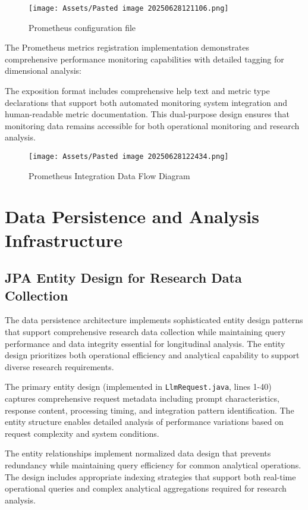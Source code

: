 \begin{figure}[H]
    \centering
    \texttt{[image: Assets/Pasted image 20250628121106.png]}
    \caption{Prometheus configuration file}
\end{figure}

The Prometheus metrics registration implementation demonstrates comprehensive performance monitoring capabilities with detailed tagging for dimensional analysis:



The exposition format includes comprehensive help text and metric type declarations that support both automated monitoring system integration and human-readable metric documentation. This dual-purpose design ensures that monitoring data remains accessible for both operational monitoring and research analysis.

\begin{figure}[H]
    \centering
    \texttt{[image: Assets/Pasted image 20250628122434.png]}
    \caption{Prometheus Integration Data Flow Diagram}
\end{figure}


\section{Data Persistence and Analysis Infrastructure}

\subsection{JPA Entity Design for Research Data Collection}

The data persistence architecture implements sophisticated entity design patterns that support comprehensive research data collection while maintaining query performance and data integrity essential for longitudinal analysis. The entity design prioritizes both operational efficiency and analytical capability to support diverse research requirements.

The primary entity design (implemented in \texttt{LlmRequest.java}, lines 1-40) captures comprehensive request metadata including prompt characteristics, response content, processing timing, and integration pattern identification. The entity structure enables detailed analysis of performance variations based on request complexity and system conditions.


The entity relationships implement normalized data design that prevents redundancy while maintaining query efficiency for common analytical operations. The design includes appropriate indexing strategies that support both real-time operational queries and complex analytical aggregations required for research analysis.

